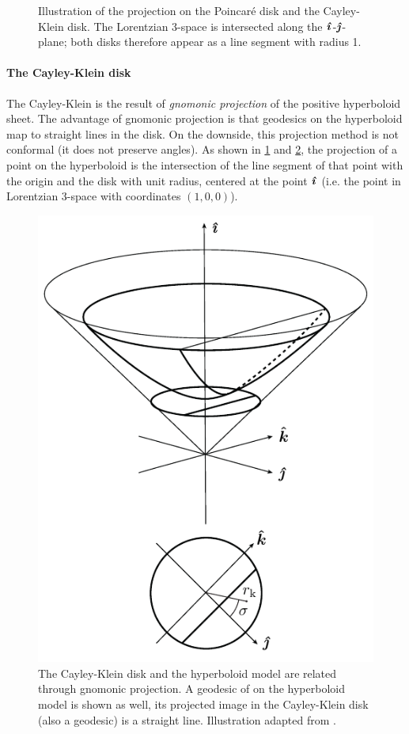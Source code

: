 \begin{figure}[ht!]
    \centering
    
    \caption{Illustration of the projection on the Poincaré disk and the Cayley-Klein disk. The Lorentzian 3-space is intersected along the $\quati$-$\quatj$-plane; both disks therefore appear as a line segment with radius 1.}
    \label{fig:hyperboloid_projection}
\end{figure}

\paragraph{The Cayley-Klein disk} The Cayley-Klein is the result of \emph{gnomonic projection} of the positive hyperboloid sheet. The advantage of gnomonic projection is that geodesics on the hyperboloid map to straight lines in the disk. On the downside, this projection method is not conformal (it does not preserve angles). As shown in \cref{fig:hyperboloid_projection} and \cref{fig:cayley_disk}, the projection of a point on the hyperboloid is the intersection of the line segment of that point with the origin and the disk with unit radius, centered at the point \(\quati\) (i.e. the point in Lorentzian 3-space with coordinates \((1, 0, 0)\)). 
\begin{figure}[ht!]
    \centering
    \includegraphics[scale=1]{media/other/cayley_disk-eps-converted-to}
    \caption{The Cayley-Klein disk and the hyperboloid model are related through gnomonic projection. A geodesic of on the hyperboloid model is shown as well, its projected image in the Cayley-Klein disk (also a geodesic) is a straight line. Illustration adapted from \citet{Balazs1986}.}
    \label{fig:cayley_disk}
\end{figure}

